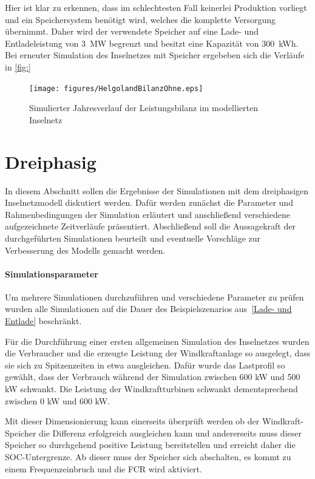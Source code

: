 Hier ist klar zu erkennen, dass im schlechtesten Fall keinerlei Produktion vorliegt und ein Speichersystem benötigt wird, welches die komplette Versorgung übernimmt. Daher wird der verwendete Speicher auf eine Lade- und Entladeleistung von 3~MW begrenzt und besitzt eine Kapazität von 300~kWh. Bei erneuter Simulation des Inselnetzes mit Speicher ergebeben sich die Verläufe in \autoref{fig:}

\begin{figure}[H]
	\centering
	\texttt{[image: figures/HelgolandBilanzOhne.eps]}
	\caption{Simulierter Jahresverlauf der Leistungsbilanz im modellierten Inselnetz}
	\label{fig:helgolandBilanzOhne}
\end{figure}

\section{Dreiphasig}

In diesem Abschnitt sollen die Ergebnisse der Simulationen mit dem dreiphasigen Inselnetzmodell diskutiert werden.
Dafür werden zunächst die Parameter und Rahmenbedingungen der Simulation erläutert und anschließend verschiedene 
aufgezeichnete Zeitverläufe präsentiert.
Abschließend soll die Aussagekraft der durchgeführten Simulationen beurteilt und eventuelle Vorschläge 
zur Verbesserung des Modells gemacht werden.

\paragraph{Simulationsparameter}
Um mehrere Simulationen durchzuführen und verschiedene Parameter zu prüfen wurden alle Simulationen auf die Dauer 
des Beispielszenarios aus~\ref{Lade- und Entlade} beschränkt.

Für die Durchführung einer ersten allgemeinen Simulation des Inselnetzes wurden die Verbraucher und die erzeugte
Leistung der Windkraftanlage so ausgelegt, dass sie sich zu Spitzenzeiten in etwa ausgleichen.
Dafür wurde das Lastprofil so gewählt, dass der Verbrauch während der Simulation zwischen 600 kW und 500 kW schwankt.
Die Leistung der Windkraftturbinen schwankt dementsprechend zwischen 0 kW und 600 kW.

Mit dieser Dimensionierung kann einerseits überprüft werden ob der Windkraft-Speicher die Differenz erfolgreich ausgleichen kann
und andererseits muss dieser Speicher so durchgehend positive Leistung bereitstellen und erreicht daher die SOC-Untergrenze.
Ab dieser muss der Speicher sich abschalten, es kommt zu einem Frequenzeinbruch und die FCR wird aktiviert.

